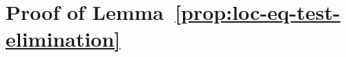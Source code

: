 \section{Proof of Lemma~\ref{prop:loc-eq-test-elimination}}
\label{sec:proof-lol-eq-test-elim}

\SimpleReduction*



	
	
	
	
	
	

